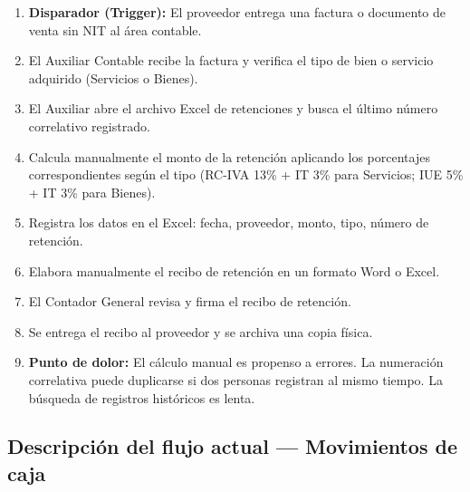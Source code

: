 \documentclass[stu]{apa7}
\begin{document}
\begin{enumerate}
    \item \textbf{Disparador (Trigger):} El proveedor entrega una factura o documento de venta sin NIT al área contable.

    \item El Auxiliar Contable recibe la factura y verifica el tipo de bien o servicio adquirido (Servicios o Bienes).

    \item El Auxiliar abre el archivo Excel de retenciones y busca el último número correlativo registrado.

    \item Calcula manualmente el monto de la retención aplicando los porcentajes correspondientes según el tipo (RC-IVA 13\% + IT 3\% para Servicios; IUE 5\% + IT 3\% para Bienes).

    \item Registra los datos en el Excel: fecha, proveedor, monto, tipo, número de retención.

    \item Elabora manualmente el recibo de retención en un formato Word o Excel.

    \item El Contador General revisa y firma el recibo de retención.

    \item Se entrega el recibo al proveedor y se archiva una copia física.

    \item \textbf{Punto de dolor:} El cálculo manual es propenso a errores. La numeración correlativa puede duplicarse si dos personas registran al mismo tiempo. La búsqueda de registros históricos es lenta.
\end{enumerate}

\subsection{Descripción del flujo actual --- Movimientos de caja}
\end{document}
